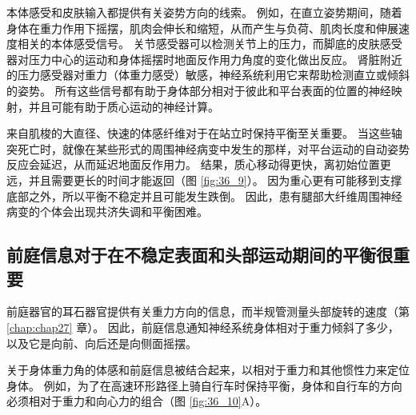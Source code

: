 本体感受和皮肤输入都提供有关姿势方向的线索。 例如，在直立姿势期间，随着身体在重力作用下摇摆，肌肉会伸长和缩短，从而产生与负荷、肌肉长度和伸展速度相关的本体感受信号。 关节感受器可以检测关节上的压力，而脚底的皮肤感受器对压力中心的运动和身体摇摆时地面反作用力角度的变化做出反应。 肾脏附近的压力感受器对重力（体重力感受）敏感，神经系统利用它来帮助检测直立或倾斜的姿势。 所有这些信号都有助于身体部分相对于彼此和平台表面的位置的神经映射，并且可能有助于质心运动的神经计算。

来自肌梭的大直径、快速的体感纤维对于在站立时保持平衡至关重要。 当这些轴突死亡时，就像在某些形式的周围神经病变中发生的那样，对平台运动的自动姿势反应会延迟，从而延迟地面反作用力。 结果，质心移动得更快，离初始位置更远，并且需要更长的时间才能返回（图 \ref{fig:36_9}）。 因为重心更有可能移到支撑底部之外，所以平衡不稳定并且可能发生跌倒。 因此，患有腿部大纤维周围神经病变的个体会出现共济失调和平衡困难。

\subsection{前庭信息对于在不稳定表面和头部运动期间的平衡很重要}

前庭器官的耳石器官提供有关重力方向的信息，而半规管测量头部旋转的速度（第 \ref{chap:chap27} 章）。 因此，前庭信息通知神经系统身体相对于重力倾斜了多少，以及它是向前、向后还是向侧面摇摆。

关于身体重力角的体感和前庭信息被结合起来，以相对于重力和其他惯性力来定位身体。 
例如，为了在高速环形路径上骑自行车时保持平衡，身体和自行车的方向必须相对于重力和向心力的组合（图 \ref{fig:36_10}A）。

